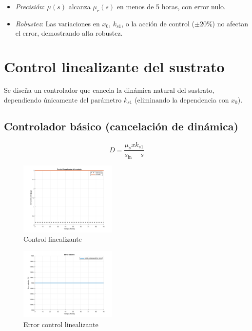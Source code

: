 \documentclass[letterpaper, 10 pt, conference]{ieeeconf}  %
\begin{document}
\begin{itemize}  
    \item \textit{Precisión}: \(\mu(s)\) alcanza \(\mu_r(s)\) en menos de 5 horas, con error nulo.  
    \item \textit{Robustez}: Las variaciones en \(x_0\), \(k_{s1}\), o la acción de control (\(\pm 20\%\)) no afectan el error, demostrando alta robustez.  
\end{itemize}  


\section{Control linealizante del sustrato}  
Se diseña un controlador que cancela la dinámica natural del sustrato, dependiendo únicamente del parámetro \(k_{s1}\) (eliminando la dependencia con \(x_0\)).  

\subsection{Controlador básico (cancelación de dinámica)}

\begin{equation}
D = \frac{\mu_s x k_{s1}}{s_{\text{in}} - s}
\end{equation}

\begin{figure}[h]
  \centering
  \includegraphics[width=0.43\textwidth]{./images_tp3/lin.png}
  \caption{Control linealizante}
\end{figure}
\begin{figure}[h]
  \centering
  \includegraphics[width=0.43\textwidth]{./images_tp3/lin_err.png}
  \caption{Error control linealizante}
\end{figure}
\end{document}
